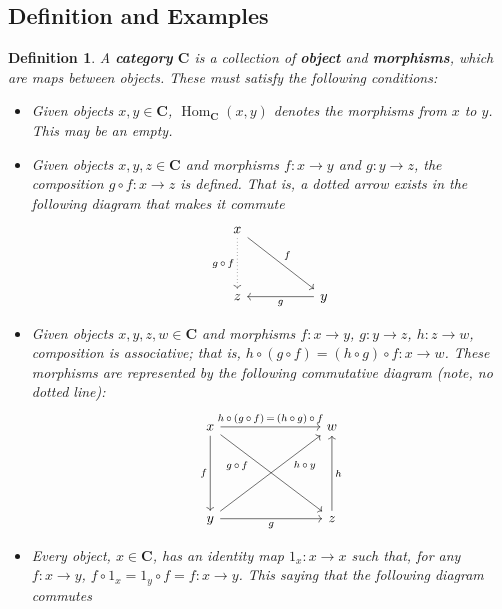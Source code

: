 \documentclass[12pt,reqno]{amsart}
\theoremstyle{plain}
\newtheorem{defi}{Definition}
\newcommand{\cat}{\mathbf{C}}
\DeclareMathOperator{\Hom}{Hom}
\begin{document}
\subsection{Definition and Examples}
\begin{defi} A \textbf{category} $\mathbf{C}$ is a collection of \textbf{object} and \textbf{morphisms}, which are maps between objects. These must satisfy the following conditions: 
\begin{itemize}
\item[\textup{(i)}] Given objects $x, y \in \cat$, $\Hom_{\cat} (x, y)$ denotes the morphisms from $x$ to $y$. This may be an empty. 
\item[\textup{(ii)}] Given objects $x, y, z \in \cat$ and morphisms $f \colon x \to y$ and $g \colon y \to z$, the composition $g \circ f \colon x \to z$ is defined. That is, a dotted arrow exists in the following diagram that makes it commute 
\[ 
\begin{tikzcd}
x \arrow[rrdd, "f"] \arrow[dd, "g \, \circ \, f"', dotted] &  &                   \\
                                             &  &                   \\
z                                            &  & y \arrow[ll, "g"]
\end{tikzcd}
\] 
\item[\textup{(iii)}] Given objects $x, y, z, w \in \cat$ and morphisms $f \colon x \to y$, $g \colon y \to z$, $h \colon z \to w$, composition is associative; that is, $h \circ ( g \circ f) = (h \circ g) \circ f \colon x \to w$. These morphisms are represented by the following commutative diagram (note, no dotted line): 
\[
\begin{tikzcd}
x \arrow[ddd, "f"'] \arrow[rrr, "h \, \circ \, ( g \, \circ \, f) \, = \, (h \, \circ \, g) \, \circ \, f"] \arrow[rrrddd, "\; \; \; \; \; \; h \, \circ \, y"] &  &  & w                   \\
                                                         &  &  &                     \\
                                                         &  &  &                     \\
y \arrow[rrr, "g"'] \arrow[rrruuu, "g \, \circ \, f \; \; \; \; \; \; "]                  &  &  & z \arrow[uuu, "h"']
\end{tikzcd}
\]
\item[\textup{(iiii)}] Every object, $x \in \cat$, has an identity map $1_x \colon x \to x$ such that, for any $f \colon x \to y$, $f \circ 1_x = 1_y \circ f = f \colon x \to y$. This saying that the following diagram commutes

\end{itemize}
\end{defi}
\end{document}
